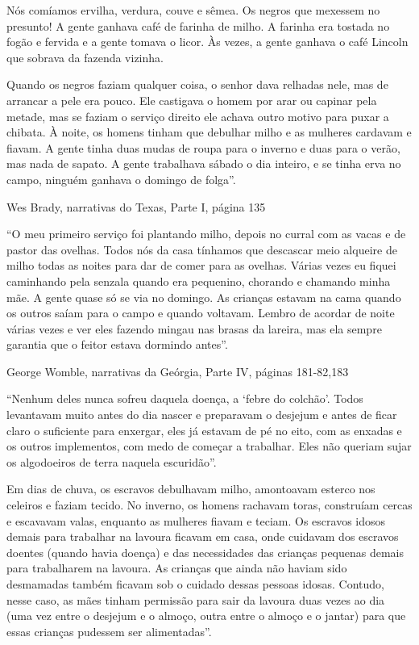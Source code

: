 Nós comíamos ervilha, verdura, couve e sêmea. Os negros que mexessem no
presunto! A gente ganhava café de farinha de milho. A farinha era
tostada no fogão e fervida e a gente tomava o licor. Às vezes, a gente
ganhava o café Lincoln que sobrava da fazenda vizinha.

Quando os negros faziam qualquer coisa, o senhor dava relhadas nele, mas
de arrancar a pele era pouco. Ele castigava o homem por arar ou capinar
pela metade, mas se faziam o serviço direito ele achava outro motivo
para puxar a chibata. À noite, os homens tinham que debulhar milho e as
mulheres cardavam e fiavam. A gente tinha duas mudas de roupa para o
inverno e duas para o verão, mas nada de sapato. A gente trabalhava
sábado o dia inteiro, e se tinha erva no campo, ninguém ganhava o
domingo de folga''.

Wes Brady, narrativas do Texas, Parte I, página 135

``O meu primeiro serviço foi plantando milho, depois no curral com as
vacas e de pastor das ovelhas. Todos nós da casa tínhamos que descascar
meio alqueire de milho todas as noites para dar de comer para as
ovelhas. Várias vezes eu fiquei caminhando pela senzala quando era
pequenino, chorando e chamando minha mãe. A gente quase só se via no
domingo. As crianças estavam na cama quando os outros saíam para o campo
e quando voltavam. Lembro de acordar de noite várias vezes e ver eles
fazendo mingau nas brasas da lareira, mas ela sempre garantia que o
feitor estava dormindo antes''.

George Womble, narrativas da Geórgia, Parte IV, páginas 181-82,183

``Nenhum deles nunca sofreu daquela doença, a `febre do colchão'. Todos
levantavam muito antes do dia nascer e preparavam o desjejum e antes de
ficar claro o suficiente para enxergar, eles já estavam de pé no eito,
com as enxadas e os outros implementos, com medo de começar a trabalhar.
Eles não queriam sujar os algodoeiros de terra naquela escuridão''.

Em dias de chuva, os escravos debulhavam milho, amontoavam esterco nos
celeiros e faziam tecido. No inverno, os homens rachavam toras,
construíam cercas e escavavam valas, enquanto as mulheres fiavam e
teciam. Os escravos idosos demais para trabalhar na lavoura ficavam em
casa, onde cuidavam dos escravos doentes (quando havia doença) e das
necessidades das crianças pequenas demais para trabalharem na lavoura.
As crianças que ainda não haviam sido desmamadas também ficavam sob o
cuidado dessas pessoas idosas. Contudo, nesse caso, as mães tinham
permissão para sair da lavoura duas vezes ao dia (uma vez entre o
desjejum e o almoço, outra entre o almoço e o jantar) para que essas
crianças pudessem ser alimentadas''.


